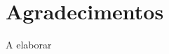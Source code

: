 \documentclass[11pt,twoside,a4paper]{book}
\begin{document}
\chapter*{Agradecimentos}

A elaborar

%






\end{document}
